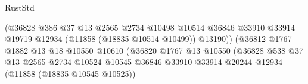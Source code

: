 \begin{lexlean}{RustStd}
\begin{coremodule}
                                                        (@36828
                                                          @386
                                                          @37
                                                          @13
                                                          @2565
                                                          @2734
                                                          @10498
                                                          @10514
                                                          @36846
                                                          @33910
                                                          @33914
                                                          @19719
                                                          @12934
                                                          (@11858 (@18835 @10514 @10499))
                                                          @13190))
                                                      (@36812
                                                        @1767
                                                        @1882
                                                        @13
                                                        @18
                                                        @10550
                                                        @10610
                                                        (@36820
                                                          @1767
                                                          @13
                                                          @10550
                                                          (@36828
                                                            @538
                                                            @37
                                                            @13
                                                            @2565
                                                            @2734
                                                            @10524
                                                            @10545
                                                            @36846
                                                            @33910
                                                            @33914
                                                            @20244
                                                            @12934
                                                            (@11858 (@18835 @10545 @10525))

\end{coremodule}
\end{lexlean}
